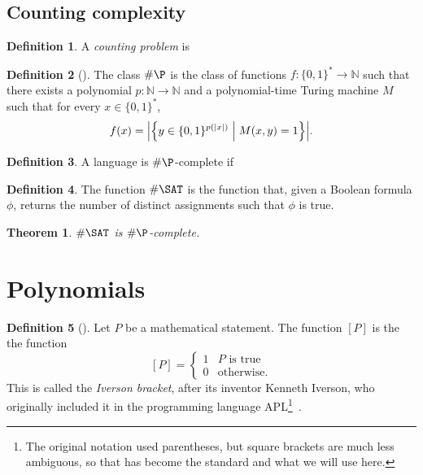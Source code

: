 \documentclass[english,12pt]{reedthesis}
\theoremstyle{plain}
\newtheorem{thm}{Theorem}[section]
\theoremstyle{definition}
\newtheorem{defn}[defn]{Definition}
\theoremstyle{remark}
\DeclarePairedDelimiter{\abs}{\lvert}{\rvert}
\newcommand{\middlemid}{%
  \ensuremath{\;\middle\vert\;}
}
\begin{document}
\subsection{Counting complexity}

\begin{defn}\label{def:counting-problem}
  A \emph{counting problem} is %
\end{defn}

\begin{defn}[{\cite[Def.\ 9.2]{AB09}}]\label{def:hash-p}
  The class $\#\P$ is the class of functions $f\colon \{0, 1\}^{*} \rightarrow \mathbb{N}$ such
  that there exists a polynomial $p\colon \mathbb{N} \rightarrow \mathbb{N}$ and a polynomial-time
  Turing machine $M$ such that for every $x \in \{0, 1\}^{*}$,
  \begin{equation}
    f(x) = \abs*{\mleft\{y \in \{0, 1\}^{p(\abs{x})} \middlemid M(x, y) = 1\mright\}}.
  \end{equation}
\end{defn}

\begin{defn}\label{def:hash-p-complete}
  A language is $\#\P$-complete if %
\end{defn}

\begin{defn}\label{def:hash-sat}
  The function $\#\SAT$ is the function that, given a Boolean formula $\phi$,
  returns the number of distinct assignments such that $\phi$ is true.
\end{defn}

\begin{thm}\label{thm-hash-sat-is-complete}
  $\#\SAT$ is $\#\P$-complete.
\end{thm}

\section{Polynomials}\label{sec:polynomial}

\begin{defn}[{\cite{Knu92}}]\label{def:iverson-bracket}
  Let $P$ be a mathematical statement. The function $[P]$ is the the function
  \begin{equation}\label{eqn:iverson-bracket}
    [P] = \begin{cases}
      1 & P \text{ is true} \\
      0 & \text{otherwise.}
    \end{cases}
  \end{equation}
  This is called the \emph{Iverson bracket}, after its inventor Kenneth Iverson,
  who originally included it in the programming language APL\footnote{The
    original notation used parentheses, but square brackets are much less
    ambiguous, so that has become the standard and what we will use
    here.}~\cite[11]{APL}.
\end{defn}
\end{document}
